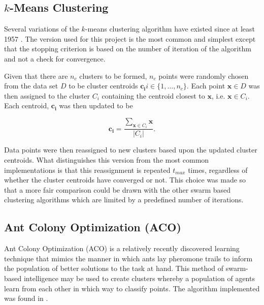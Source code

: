 \documentclass[conference]{IEEEtran}
\begin{document}
  \subsection{$k$-Means Clustering}
  Several variations of the $k$-means clustering algorithm have existed since at least 1957 \cite{steinhaus}. The version used for this project is the most common and simplest except that the stopping criterion is based on the number of iteration of the algorithm and not a check for convergence.

  Given that there are $n_c$ clusters to be formed, $n_c$ points were randomly chosen from the data set $D$ to be cluster centroids $\mathbf{c_i} i \in \{1, \ldots, n_c \} $. Each point $\mathbf{x} \in D$ was then assigned to the cluster $C_i$ containing the centroid closest to $\mathbf{x}$, i.e. $\mathbf{x} \in C_i$. Each centroid, $\mathbf{c_i}$ was then updated to be

  \begin{equation} \label{eq:centroid}
    \mathbf{c_i} = \frac{\sum_{\mathbf{x} \in C_i} \mathbf{x}}{|C_i|}.
  \end{equation}

  Data points were then reassigned to new clusters based upon the updated cluster centroids. What distinguishes this version from the most common implementations is that this reassignment is repeated $t_{max}$ times, regardless of whether the cluster centroids have converged or not. This choice was made so that a more fair comparison could be drawn with the other swarm based clustering algorithms which are limited by a predefined number of iterations.
  

  \subsection{Ant Colony Optimization (ACO)}
  Ant Colony Optimization (ACO) is a relatively recently discovered learning technique \cite{dorigo} that mimics the manner in which ants lay pheromone trails to inform the population of better solutions to the task at hand. This method of swarm-based intelligence may be used to create clusters whereby a population of agents learn from each other in which way to classify points. The algorithm implemented was found in \cite{runkler}.
\end{document}
